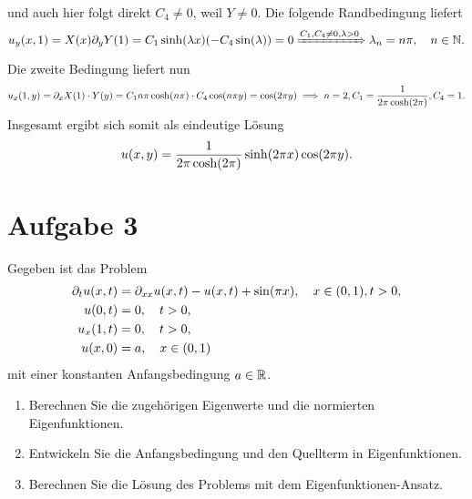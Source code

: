 \documentclass{exercise}
\begin{document}
    und auch hier folgt direkt \(C_4 \ne 0\), weil \(Y \ne 0\).
    Die folgende Randbedingung liefert
    \[
        u_y\parentheses*{x, 1} = X\parentheses*{x}\partial_y Y\parentheses*{1} = C_1 \sinh\parentheses*{\lambda x}\parentheses*{-C_4 \sin\parentheses*{\lambda}} = 0 \xRightarrow{C_1, C_4 \ne 0, \lambda > 0} \lambda_n = n\pi, \quad n \in \N.
    \]
    Die zweite Bedingung liefert nun
    \[
        u_x\parentheses*{1, y} = \partial_x X\parentheses*{1} \cdot Y\parentheses*{y} = C_1 n\pi\cosh\parentheses*{n\pi} \cdot C_4 \cos\parentheses*{n\pi y} = \cos\parentheses*{2\pi y} \implies n = 2, C_1 = \frac{1}{2\pi\cosh\parentheses*{2\pi}}, C_4 = 1.
    \]
    Insgesamt ergibt sich somit als eindeutige Lösung
    \[
        u\parentheses*{x, y} = \frac{1}{2\pi\cosh\parentheses*{2\pi}}\sinh\parentheses*{2\pi x}\cos\parentheses*{2\pi y}.
    \]


    \section*{Aufgabe 3}
    
    \begin{problem}
        Gegeben ist das Problem
        \begin{align*}
            \partial_t u\parentheses*{x, t} &= \partial_{xx}u\parentheses*{x, t} - u\parentheses*{x, t} + \sin\parentheses*{\pi x}, \quad x \in \parentheses*{0, 1}, t > 0,\\
            u\parentheses*{0, t} &= 0, \quad t > 0,\\
            u_x\parentheses*{1, t} &= 0, \quad t > 0,\\
            u\parentheses*{x, 0} &= a, \quad x \in \parentheses*{0, 1}
        \end{align*}
        mit einer konstanten Anfangsbedingung \(a \in \mathbb{R}\).
        \begin{enumerate}
            \item Berechnen Sie die zugehörigen Eigenwerte und die normierten Eigenfunktionen.
            \item Entwickeln Sie die Anfangsbedingung und den Quellterm in Eigenfunktionen.
            \item Berechnen Sie die Lösung des Problems mit dem Eigenfunktionen-Ansatz.
        \end{enumerate}
    \end{problem}
    
\end{document}
